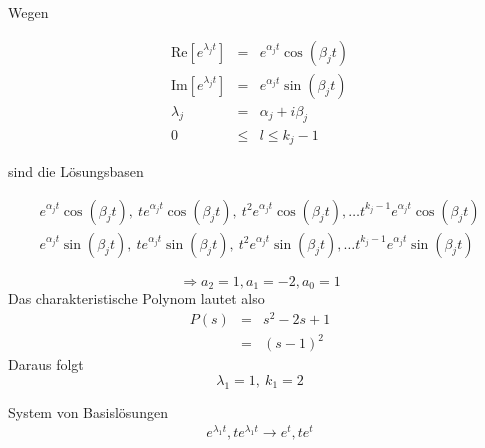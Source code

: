\documentclass[10pt,a4paper]{article}
\begin{document}
Wegen

\begin{eqnarray*}
\mathrm{Re}[e^{\lambda_j t}] &=& e^{\alpha_j t} \cos(\beta_j t) \\
\mathrm{Im}[e^{\lambda_j t}] &=& e^{\alpha_j t} \sin(\beta_j t) \\
\lambda_j &=& \alpha_j +i \beta_j \\
0 &\leq&  l \leq k_j -1
\end{eqnarray*}

sind die Lösungsbasen

\begin{eqnarray*}
e^{\alpha_j t} \cos(\beta_j t), ~ t e^{\alpha_j t} \cos(\beta_j t), ~t^{2}e^{\alpha_j t} \cos(\beta_j t), \ldots t^{k_j-1}e^{\alpha_j t} \cos(\beta_j t)  \\
e^{\alpha_j t} \sin(\beta_j t), ~ t e^{\alpha_j t} \sin(\beta_j t), ~t^{2}e^{\alpha_j t} \sin(\beta_j t), \ldots t^{k_j-1}e^{\alpha_j t} \sin(\beta_j t)  
\end{eqnarray*}


%
%
%
%

\begin{bsp}[$ L(y) =y''-2y'+y $]
\begin{equation*}
\Rightarrow a_2=1, a_1=-2, a_0=1
\end{equation*}
Das charakteristische Polynom lautet also
\begin{eqnarray*}
P(s)&=&s^{2}-2s+1\\
&=&(s-1)^{2}
\end{eqnarray*}
Daraus folgt 
\begin{equation}
 \lambda_{1}=1 , ~ k_1=2
\end{equation}

System von Basislösungen 
\begin{eqnarray*}
e^{\lambda_1 t}, t e^{\lambda_1 t} \rightarrow e^{ t}, t e^{ t}
\end{eqnarray*}
\end{bsp}
\end{document}
